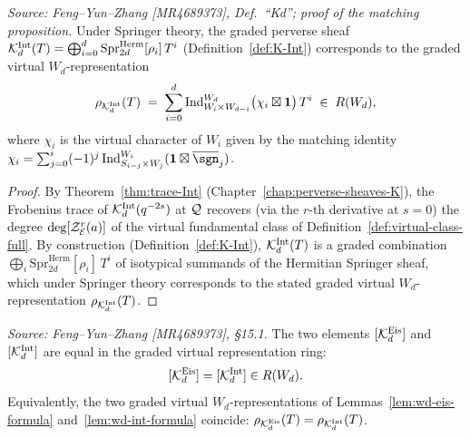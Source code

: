 \begin{lemma}
  \label{lem:wd-int-formula}
  \textit{Source: Feng--Yun--Zhang [MR4689373], Def.~``Kd''; proof of the matching proposition.}
  Under Springer theory, the graded perverse sheaf \(\mathcal{K}_d^{\mathrm{Int}}(T)
  = \bigoplus_{i=0}^d \mathrm{Spr}^{\mathrm{Herm}}_{2d}[\rho_i]\,T^i\)
  (Definition~\ref{def:K-Int}) corresponds to the graded virtual
  \(W_d\)-representation
  \[
    \rho_{\mathcal{K}_d^{\mathrm{Int}}}(T)
    \;=\;
    \sum_{i=0}^{d} \operatorname{Ind}_{W_i \times W_{d-i}}^{W_d}
      \bigl(\chi_i \boxtimes \mathbf{1}\bigr)\, T^{i}
    \;\in\; R(W_d),
  \]
  where \(\chi_i\) is the virtual character of \(W_i\) given by the matching identity
  \(\chi_i = \sum_{j=0}^{i}(-1)^j \Ind_{S_{i-j}\times W_j}^{W_i}
  (\mathbf{1}\boxtimes\overline{\sgn}_j)\).
\end{lemma}

\begin{proof}
  By Theorem~\ref{thm:trace-Int} (Chapter~\ref{chap:perverse-sheaves-K}), the Frobenius
  trace of \(\mathcal{K}_d^{\mathrm{Int}}(q^{-2s})\) at \(\mathcal{Q}\) recovers (via the \(r\)-th
  derivative at \(s=0\)) the degree \(\deg[\mathcal{Z}_{\mathcal{E}}^r(a)]\) of the virtual fundamental
  class of Definition~\ref{def:virtual-class-full}. By construction
  (Definition~\ref{def:K-Int}), \(\mathcal{K}_d^{\mathrm{Int}}(T)\) is a graded combination
  \(\bigoplus_i \mathrm{Spr}^{\mathrm{Herm}}_{2d}[\rho_i]\,T^i\) of isotypical summands of
  the Hermitian Springer sheaf, which under Springer theory corresponds to the stated
  graded virtual \(W_d\)-representation \(\rho_{\mathcal{K}_d^{\mathrm{Int}}}(T)\).
\end{proof}

\begin{theorem}
  \label{thm:wd-rep-identity}
  \textit{Source: Feng--Yun--Zhang [MR4689373], \S15.1.}
  The two elements \([\mathcal{K}_d^{\mathrm{Eis}}]\) and \([\mathcal{K}_d^{\mathrm{Int}}]\) are equal
  in the graded virtual representation ring:
  \[
    [\mathcal{K}_d^{\mathrm{Eis}}] = [\mathcal{K}_d^{\mathrm{Int}}] \in R(W_d).
  \]
  Equivalently, the two graded virtual \(W_d\)-representations of
  Lemmas~\ref{lem:wd-eis-formula} and~\ref{lem:wd-int-formula} coincide:
  \(\rho_{\mathcal{K}_d^{\mathrm{Eis}}}(T) = \rho_{\mathcal{K}_d^{\mathrm{Int}}}(T)\).
\end{theorem}


